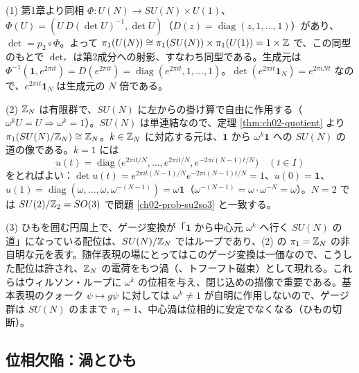 \begin{solution}
(1) 第1章より同相 $\Phi\colon U(N)\to SU(N)\times U(1)$、$\Phi(U)=(U\,D(\det U)^{-1},\det U)$（$D(z)=\operatorname{diag}(z,1,\dots,1)$）があり、$\det=p_2\circ\Phi$。よって $\pi_1(U(N))\cong\pi_1(SU(N))\times\pi_1(U(1))=1\times\mathbb{Z}$ で、この同型のもとで $\det_*$ は第2成分への射影、すなわち同型である。生成元は $\Phi^{-1}(\mathbf 1,e^{2\pi it})=D(e^{2\pi it})=\operatorname{diag}(e^{2\pi it},1,\dots,1)$。$\det(e^{2\pi it}\mathbf 1_N)=e^{2\pi iNt}$ なので、$e^{2\pi it}\mathbf 1_N$ は生成元の $N$ 倍である。

(2) $\mathbb{Z}_N$ は有限群で、$SU(N)$ に左からの掛け算で自由に作用する（$\omega^kU=U\Rightarrow\omega^k=1$）。$SU(N)$ は単連結なので、定理 \ref{thm:ch02-quotient} より $\pi_1(SU(N)/\mathbb{Z}_N)\cong\mathbb{Z}_N$。$k\in\mathbb{Z}_N$ に対応する元は、$\mathbf 1$ から $\omega^k\mathbf 1$ への $SU(N)$ の道の像である。$k=1$ には
\[
u(t)=\operatorname{diag}\bigl(e^{2\pi it/N},\dots,e^{2\pi it/N},e^{-2\pi i(N-1)t/N}\bigr)\quad(t\in I)
\]
をとればよい：$\det u(t)=e^{2\pi i t(N-1)/N}e^{-2\pi i(N-1)t/N}=1$、$u(0)=\mathbf 1$、$u(1)=\operatorname{diag}(\omega,\dots,\omega,\omega^{-(N-1)})=\omega\mathbf 1$（$\omega^{-(N-1)}=\omega\cdot\omega^{-N}=\omega$）。$N=2$ では $SU(2)/\mathbb{Z}_2=SO(3)$ で問題 \ref{ch02-prob-su2so3} と一致する。

(3) ひもを囲む円周上で、ゲージ変換が「$\mathbf 1$ から中心元 $\omega^k$ へ行く $SU(N)$ の道」になっている配位は、$SU(N)/\mathbb{Z}_N$ ではループであり、(2) の $\pi_1=\mathbb{Z}_N$ の非自明な元を表す。随伴表現の場にとってはこのゲージ変換は一価なので、こうした配位は許され、$\mathbb{Z}_N$ の電荷をもつ渦（、トフーフト磁束）として現れる。これらはウィルソン・ループに $\omega^k$ の位相を与え、閉じ込めの描像で重要である。基本表現のクォーク $\psi\mapsto g\psi$ に対しては $\omega^k\ne1$ が自明に作用しないので、ゲージ群は $SU(N)$ のままで $\pi_1=1$、中心渦は位相的に安定でなくなる（ひもの切断）。
\end{solution}

\subsection{位相欠陥：渦とひも}

